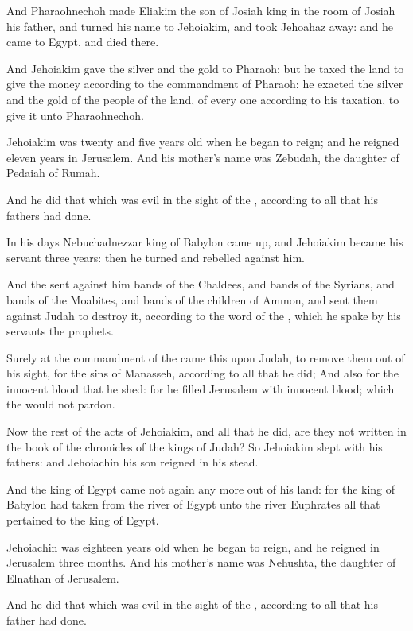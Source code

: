 \Verse And Pharaohnechoh made Eliakim the son of Josiah king in the room of Josiah his father, and turned his name to Jehoiakim, and took Jehoahaz away: and he came to Egypt, and died there.

\Verse And Jehoiakim gave the silver and the gold to Pharaoh; but he taxed the land to give the money according to the commandment of Pharaoh: he exacted the silver and the gold of the people of the land, of every one according to his taxation, to give it unto Pharaohnechoh.

\Verse Jehoiakim was twenty and five years old when he began to reign; and he reigned eleven years in Jerusalem. And his mother's name was Zebudah, the daughter of Pedaiah of Rumah.

\Verse And he did that which was evil in the sight of the \LORD, according to all that his fathers had done.


\Chapter
\Verse In his days Nebuchadnezzar king of Babylon came up, and Jehoiakim became his servant three years: then he turned and rebelled against him.

\Verse And the \LORD sent against him bands of the Chaldees, and bands of the Syrians, and bands of the Moabites, and bands of the children of Ammon, and sent them against Judah to destroy it, according to the word of the \LORD, which he spake by his servants the prophets.

\Verse Surely at the commandment of the \LORD came this upon Judah, to remove them out of his sight, for the sins of Manasseh, according to all that he did; \Verse And also for the innocent blood that he shed: for he filled Jerusalem with innocent blood; which the \LORD would not pardon.

\Verse Now the rest of the acts of Jehoiakim, and all that he did, are they not written in the book of the chronicles of the kings of Judah?  \Verse So Jehoiakim slept with his fathers: and Jehoiachin his son reigned in his stead.

\Verse And the king of Egypt came not again any more out of his land: for the king of Babylon had taken from the river of Egypt unto the river Euphrates all that pertained to the king of Egypt.

\Verse Jehoiachin was eighteen years old when he began to reign, and he reigned in Jerusalem three months. And his mother's name was Nehushta, the daughter of Elnathan of Jerusalem.

\Verse And he did that which was evil in the sight of the \LORD, according to all that his father had done.


